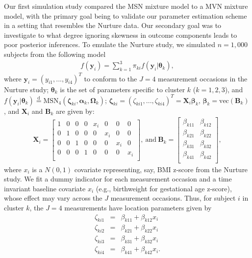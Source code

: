 \documentclass[useAMS,referee]{biom}
\begin{document}
Our first simulation study compared the MSN mixture model to a MVN mixture model, with the primary goal being to validate our parameter estimation scheme in a setting that resembles the Nurture data. Our secondary goal was to investigate to what degree ignoring skewness in outcome components leads to poor posterior inferences. To emulate the Nurture study, we simulated $n = 1,000$ subjects from the following model
\begin{eqnarray}
	\label{eq:sim1}
	f(\mathbf{y}_i) = \sum_{k = 1}^3 \pi_{ki} f(\mathbf{y}_i | \boldsymbol\theta_k),
\end{eqnarray}
where $\mathbf{y}_i = (y_{i1},...,y_{i4})^T$ to conform to the $J = 4$ measurement occasions in the Nurture study; $\boldsymbol\theta_k$ is the set of parameters specific to cluster $k$ ($k = 1,2,3$), and $f(\mathbf{y}_i | \boldsymbol\theta_k) \stackrel{\text{d}}{=} \text{MSN}_4(\boldsymbol\zeta_{ki},\boldsymbol\alpha_k,\boldsymbol\Omega_k)$; $\boldsymbol\zeta_{ki} = (\zeta_{ki1},...,\zeta_{ki4})^T = \mathbf{X}_i \boldsymbol\beta_{k}$, $\boldsymbol\beta_k = \text{vec}(\mathbf{B}_k)$, and $\mathbf{X}_i$ and $\mathbf{B}_k$ are given by:
\begin{eqnarray}
	\mathbf{X}_i = 
	\begin{bmatrix}
		1 & 0 & 0 & 0 & x_i & 0 & 0 & 0\\
		0 & 1 & 0 & 0 & 0 & x_i & 0 & 0\\
		0 & 0 & 1 & 0 & 0 & 0 & x_i & 0\\
		0 & 0 & 0 & 1 & 0 & 0 & 0 & x_i\\
	\end{bmatrix}, \ \text{and} \ 
	\mathbf{B}_k = 
	\begin{bmatrix}
		\beta_{k11} & \beta_{k12} \\
		\beta_{k21} & \beta_{k22} \\
		\beta_{k31} & \beta_{k32} \\
		\beta_{k41} & \beta_{k42} \\
	\end{bmatrix}, \nonumber
\end{eqnarray}
where $x_i$ is a $N(0,1)$ covariate representing, say, BMI z-score from the Nurture study. We fit a dummy indicator for each measurement occasion and a time invariant baseline covariate $x_i$ (e.g., birthweight for gestational age z-score), whose effect may vary across the $J$ measurement occasions. Thus, for subject $i$ in cluster $k$, the $J = 4$ measurements have location parameters given by
\begin{eqnarray}
	\zeta_{ki1} &=& \beta_{k11} + \beta_{k12}x_i \nonumber \\
	\zeta_{ki2} &=& \beta_{k21} + \beta_{k22}x_i \nonumber \\
	\zeta_{ki3} &=& \beta_{k31} + \beta_{k32}x_i \nonumber \\
	\zeta_{ki4} &=& \beta_{k41} + \beta_{k42}x_i. \nonumber 
\end{eqnarray}
\end{document}
